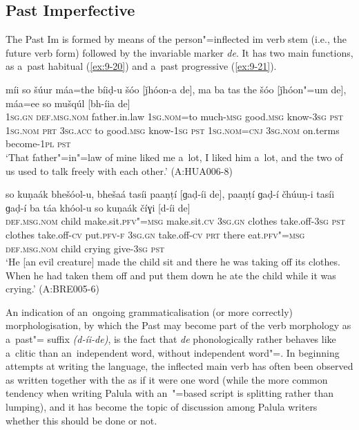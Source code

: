 \subsection{Past Imperfective}
\label{subsec:9-1-6}

The Past Im is formed by means of the person"=inflected im verb stem (i.e., the future verb form) followed by the invariable marker \textit{de}. It has two main functions, as a~past habitual (\ref{ex:9-20}) and a~past progressive (\ref{ex:9-21}).

\begin{exe}
\ex
\label{ex:9-20}
\gll míi so šúur máa=the bíiḍ-u šóo [ǰhóon-a de], ma ba tas the šóo [ǰhóon"=um de], máa=ee so mušqúl [bh-íia de] \\
\textsc{1sg.gn} \textsc{def.msg.nom} father.in.law \textsc{1sg.nom=}to much-\textsc{msg} good.\textsc{msg} know-\textsc{3sg} \textsc{pst} \textsc{1sg.nom} \textsc{prt} \textsc{3sg.acc}  to good.\textsc{msg} know-\textsc{1sg } \textsc{pst } \textsc{1sg.nom=cnj}  \textsc{3sg.nom} on.terms become-\textsc{1pl} \textsc{pst} \\
\glt `That father"=in"=law of mine liked me a~lot, I liked him a~lot, and the two of us used to talk freely with each other.' (A:HUA006-8)

\ex
\label{ex:9-21}
\gll so kuṇaák bhešóol-u, bhešaá tasíi paaṇṭí [ɡaḍ-íi de], paaṇṭí ɡaḍ-í čhúuṇ-i tasíi ɡaḍ-í ba táa khóol-u so kuṇaák číɣi [d-íi de] \\
\textsc{def.msg.nom} child make.sit.\textsc{pfv"=msg} make.sit.\textsc{cv} \textsc{3sg.gn}  clothes take.off-\textsc{3sg } \textsc{pst} clothes take.off-\textsc{cv} put.\textsc{pfv-f}  \textsc{3sg.gn} take.off-\textsc{cv} \textsc{prt} there eat.\textsc{pfv"=msg}  \textsc{def.msg.nom} child crying give-\textsc{3sg} \textsc{pst} \\
\glt `He [an evil creature] made the child sit and there he was taking off its clothes. When he had taken them off and put them down he ate the child while it was crying.' (A:BRE005-6)
\end{exe}

An indication of an~ongoing grammaticalisation (or more correctly) morphologisation, by which the Past  may become part of the verb morphology as a~past"= suffix \textit{(d-íi-de)}, is the fact that \textit{de} phonologically rather behaves like a~clitic than an~independent word, without independent word"=. In beginning attempts at writing the language, the inflected main verb has often been observed as written together with the   as if it were one word (while the more common tendency when writing Palula with an~"=based script is splitting rather than lumping), and it has become the topic of discussion among Palula writers whether this should be done or not. 


